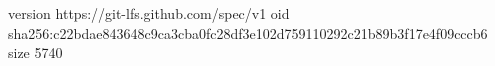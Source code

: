 version https://git-lfs.github.com/spec/v1
oid sha256:c22bdae843648c9ca3cba0fc28df3e102d759110292c21b89b3f17e4f09cccb6
size 5740
